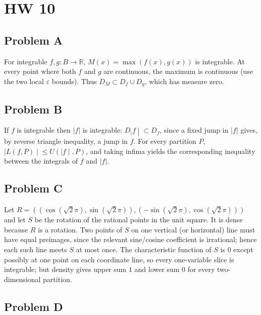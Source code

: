 \chapter{HW 10}

\section{Problem A}

For integrable \(f,g:B\rightarrow\mathbb{R}\), \(M(x) = \max\left( {f(x),g(x)} \right)\) is integrable. At every point where both \(f\) and \(g\) are continuous, the maximum is continuous (use the two local \(\varepsilon\) bounds). Thus \(D_{M} \subset D_{f} \cup D_{g}\), which has measure zero.

\section{Problem B}

If \(f\) is integrable then \(|f|\) is integrable: \(\left. D_{|}f \middle| \subset D_{f} \right.\), since a fixed jump in \(|f|\) gives, by reverse triangle inequality, a jump in \(f\). For every partition \(P\), \(\left. |L\left( {f,P} \right) \middle| \leq U\left( |f \middle| ,P \right) \right.\), and taking infima yields the corresponding inequality between the integrals of \(f\) and \(|f|\).

\section{Problem C}

Let \(R = \left( {\left( {\cos\left( {\sqrt{2}\pi} \right),\sin\left( {\sqrt{2}\pi} \right)} \right),\left( {- \sin\left( {\sqrt{2}\pi} \right),\cos\left( {\sqrt{2}\pi} \right)} \right)} \right)\) and let \(S\) be the rotation of the rational points in the unit square. It is dense because \(R\) is a rotation. Two points of \(S\) on one vertical (or horizontal) line must have equal preimages, since the relevant sine/cosine coefficient is irrational; hence each such line meets \(S\) at most once. The characteristic function of \(S\) is \(0\) except possibly at one point on each coordinate line, so every one-variable slice is integrable; but density gives upper sum \(1\) and lower sum \(0\) for every two-dimensional partition.

\section{Problem D}

